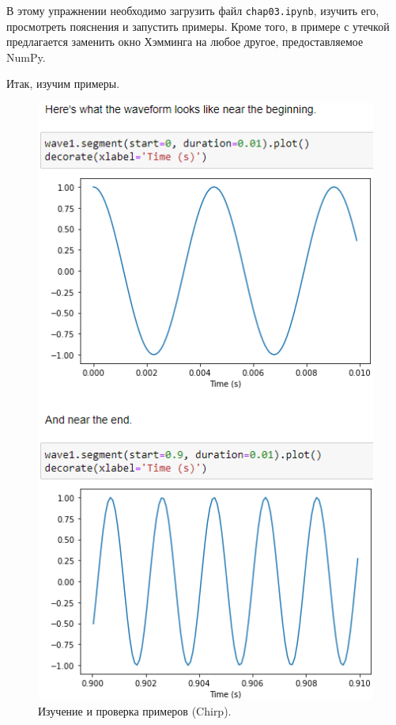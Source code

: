 \documentclass[a4paper, 14pt]{extarticle}
\begin{document}
    В этому упражнении необходимо загрузить файл \texttt{chap03.ipynb}, изучить его, просмотреть пояснения и запустить примеры.
    Кроме того, в примере с утечкой предлагается заменить окно Хэмминга на любое другое, предоставляемое NumPy.

    Итак, изучим примеры.

    \begin{figure}[H]
        \centering
        \includegraphics[width=0.6\linewidth]{resources/Images/task1_check_chirp}
        \caption{Изучение и проверка примеров (Chirp).}
        \label{fig:task1_check_chirp}
    \end{figure}
\end{document}
